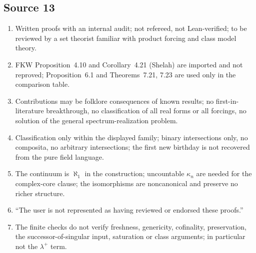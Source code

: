 \documentclass[11pt,letterpaper]{article}
\numberwithin{equation}{section}
\theoremstyle{definition}
\theoremstyle{remark}
\begin{document}
\subsection*{Source 13}
\begin{enumerate}[label=13.\arabic*,leftmargin=3.2em]
\item Written proofs with an internal audit; not refereed, not Lean-verified; to be reviewed by a set
theorist familiar with product forcing and class model theory.
\item FKW Proposition~4.10 and Corollary~4.21 (Shelah) are imported and not reproved; Proposition~6.1 and
Theorems~7.21, 7.23 are used only in the comparison table.
\item Contributions may be folklore consequences of known results; no first-in-literature breakthrough,
no classification of all real forms or all forcings, no solution of the general spectrum-realization
problem.
\item Classification only within the displayed family; binary intersections only, no composita, no
arbitrary intersections; the first new birthday is not recovered from the pure field language.
\item The continuum is $\aleph_1$ in the construction; uncountable $\kappa_n$ are needed for the
complex-core clause; the isomorphisms are noncanonical and preserve no richer structure.
\item ``The user is not represented as having reviewed or endorsed these proofs.''
\item The finite checks do not verify freshness, genericity, cofinality, preservation, the
successor-of-singular input, saturation or class arguments; in particular not the $\lambda^+$ term.
\end{enumerate}
\end{document}
